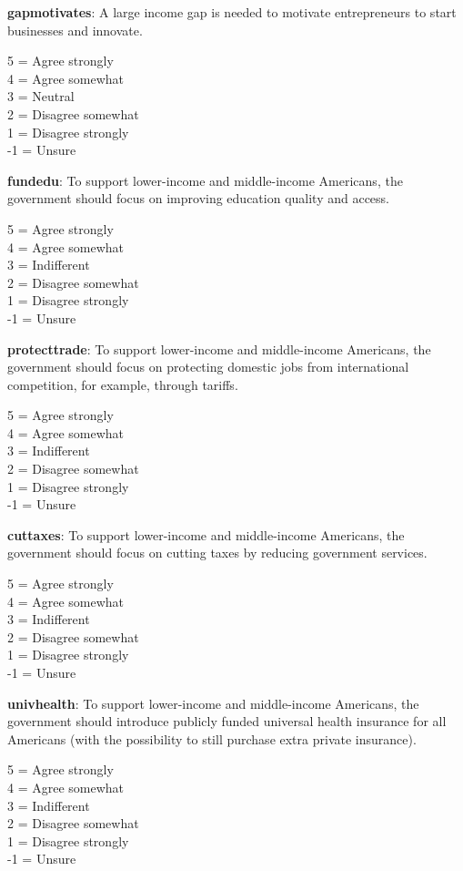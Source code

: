\documentclass[11pt, headsepline]{article}
\begin{document}
\textbf{gapmotivates}: A large income gap is needed to motivate entrepreneurs to start businesses and innovate.

5 = Agree strongly \\
4 = Agree somewhat \\
3 = Neutral \\
2 = Disagree somewhat \\
1 = Disagree strongly \\
-1 = Unsure

\textbf{fundedu}: To support lower-income and middle-income Americans, the government should focus on improving education quality and access.

5 = Agree strongly \\
4 = Agree somewhat \\
3 = Indifferent \\
2 = Disagree somewhat \\
1 = Disagree strongly \\
-1 = Unsure

\textbf{protecttrade}: To support lower-income and middle-income Americans, the government should focus on protecting domestic jobs from international competition, for example, through tariffs.

5 = Agree strongly \\
4 = Agree somewhat \\
3 = Indifferent \\
2 = Disagree somewhat \\
1 = Disagree strongly \\
-1 = Unsure

\textbf{cuttaxes}: To support lower-income and middle-income Americans, the government should focus on cutting taxes by reducing government services.

5 = Agree strongly \\
4 = Agree somewhat \\
3 = Indifferent \\
2 = Disagree somewhat \\
1 = Disagree strongly \\
-1 = Unsure

\textbf{univhealth}: To support lower-income and middle-income Americans, the government should introduce publicly funded universal health insurance for all Americans (with the possibility to still purchase extra private insurance).

5 = Agree strongly \\
4 = Agree somewhat \\
3 = Indifferent \\
2 = Disagree somewhat \\
1 = Disagree strongly \\
-1 = Unsure
\end{document}
